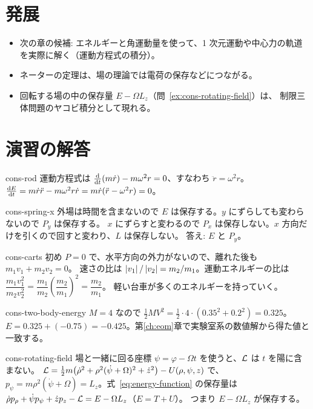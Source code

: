 \section{発展}\label{sec:cons-advanced}
\begin{itemize}
  \item 次の章の候補: エネルギーと角運動量を使って、1 次元運動や中心力の軌道を実際に解く（運動方程式の積分）。
  \item ネーターの定理は、場の理論では電荷の保存などにつながる。
  \item 回転する場の中の保存量 $E-\Omega L_z$（問~\ref{ex:cons-rotating-field}）は、
    制限三体問題のヤコビ積分として現れる。
\end{itemize}

\section{演習の解答}\label{sec:cons-solutions}

\begin{solution}{cons-rod}
運動方程式は $\frac{\mathrm{d} }{\mathrm{d} t}(m\dot r)-m\omega^2r=0$、すなわち $\ddot r=\omega^2r$。
$\frac{\mathrm{d} E}{\mathrm{d} t}=m\dot r\ddot r-m\omega^2r\dot r=m\dot r(\ddot r-\omega^2r)=0$。
\end{solution}

\begin{solution}{cons-spring-x}
外場は時間を含まないので $E$ は保存する。$y$ にずらしても変わらないので $P_y$ は保存する。
$x$ にずらすと変わるので $P_x$ は保存しない。$x$ 方向だけを引くので回すと変わり、$L$ は保存しない。
答え: $E$ と $P_y$。
\end{solution}

\begin{solution}{cons-carts}
初め $P=0$ で、水平方向の外力がないので、離れた後も $m_1v_1+m_2v_2=0$。
速さの比は $\left\lvert v_1\right\rvert/\left\lvert v_2\right\rvert=m_2/m_1$。運動エネルギーの比は
$\dfrac{m_1v_1^2}{m_2v_2^2}=\dfrac{m_1}{m_2}\left(\dfrac{m_2}{m_1}\right)^2=\dfrac{m_2}{m_1}$。
軽い台車が多くのエネルギーを持っていく。
\end{solution}

\begin{solution}{cons-two-body-energy}
$M=4$ なので $\tfrac12MV^2=\tfrac12\cdot4\cdot(0.35^2+0.2^2)=0.325$。
$E=0.325+(-0.75)=-0.425$。第\ref{ch:eom}章で実験室系の数値解から得た値と一致する。
\end{solution}

\begin{solution}{cons-rotating-field}
場と一緒に回る座標 $\psi=\varphi-\Omega t$ を使うと、$\mathcal{L}$ は $t$ を陽に含まない。
$\mathcal{L}=\tfrac12m\bigl(\dot\rho^2+\rho^2(\dot\psi+\Omega)^2+\dot z^2\bigr)-U(\rho,\psi,z)$ で、
$p_\psi=m\rho^2(\dot\psi+\Omega)=L_z$。式~\eqref{eq:energy-function} の保存量は
$\dot\rho p_\rho+\dot\psi p_\psi+\dot zp_z-\mathcal{L}=E-\Omega L_z$（$E=T+U$）。
つまり $E-\Omega L_z$ が保存する。
\end{solution}

